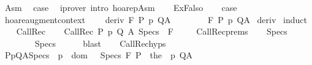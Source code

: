 \begin{isabellebody}
\ Asm\ \isamarkupfalse%
\ {\isacharquery}case\ \isamarkupfalse%
\ {\isacharparenleft}iprover\ intro{\isacharcolon}\ hoarep{\isachardot}Asm{\isacharparenright}\isanewline
{}\isamarkupfalse%
\isanewline
\ \ \isamarkupfalse%
\ ExFalso\isanewline
\ \ \isamarkupfalse%
\ {\isacharquery}case\isanewline
\ \ \ \ \isamarkupfalse%
%
\endisatagproof
{\isafoldproof}%
%
\isadelimproof
\isanewline
%
\endisadelimproof
\isanewline
{}\isamarkupfalse%
\ hoare{\isacharunderscore}augment{\isacharunderscore}context{\isacharcolon}\ \isanewline
\ \ \ deriv{\isacharcolon}\ {\isachardoublequoteopen}{\isasymGamma}{\isacharcomma}{\isasymTheta}{\isasymturnstile}\isactrlbsub {\isacharslash}F\isactrlesub \ P\ p\ Q{\isacharcomma}A{\isachardoublequoteclose}\isanewline
\ \ \ {\isachardoublequoteopen}{\isasymAnd}{\isasymTheta}{\isacharprime}{\isachardot}\ {\isasymTheta}\ {\isasymsubseteq}\ {\isasymTheta}{\isacharprime}\ {\isasymLongrightarrow}\ {\isasymGamma}{\isacharcomma}{\isasymTheta}{\isacharprime}{\isasymturnstile}\isactrlbsub {\isacharslash}F\isactrlesub \ P\ p\ Q{\isacharcomma}A{\isachardoublequoteclose}\isanewline
%
\isadelimproof
%
\endisadelimproof
%
\isatagproof
{}\isamarkupfalse%
\ deriv\isanewline
{}\isamarkupfalse%
\ {\isacharparenleft}induct{\isacharparenright}\isanewline
\ \ \isamarkupfalse%
\ CallRec\isanewline
\ \ \isamarkupfalse%
\ {\isacharparenleft}CallRec\ P\ p\ Q\ A\ Specs\ {\isasymTheta}\ F\ {\isasymTheta}{\isacharprime}{\isacharparenright}\isanewline
\ \ \isamarkupfalse%
\ CallRec{\isachardot}prems\isanewline
\ \ \isamarkupfalse%
\ {\isachardoublequoteopen}{\isasymTheta}{\isasymunion}Specs\isanewline
\ \ \ \ \ \ \ {\isasymsubseteq}\ {\isasymTheta}{\isacharprime}{\isasymunion}Specs{\isachardoublequoteclose}\isanewline
\ \ \ \ \isamarkupfalse%
\ blast\isanewline
\ \ \isamarkupfalse%
\ CallRec{\isachardot}hyps\ {\isacharparenleft}{}{\isacharparenright}\ \isanewline
\ \ \isamarkupfalse%
\ {\isachardoublequoteopen}{\isasymforall}{\isacharparenleft}P{\isacharcomma}p{\isacharcomma}Q{\isacharcomma}A{\isacharparenright}{\isasymin}Specs{\isachardot}\ \ p\ {\isasymin}\ dom\ {\isasymGamma}\ {\isasymand}\ {\isasymGamma}{\isacharcomma}{\isasymTheta}{\isacharprime}{\isasymunion}Specs\ {\isasymturnstile}\isactrlbsub {\isacharslash}F\isactrlesub \ P\ \ {\isacharparenleft}the\ {\isacharparenleft}{\isasymGamma}\ p{\isacharparenright}{\isacharparenright}\ Q{\isacharcomma}A{\isachardoublequoteclose}\isanewline

\end{isabellebody}
